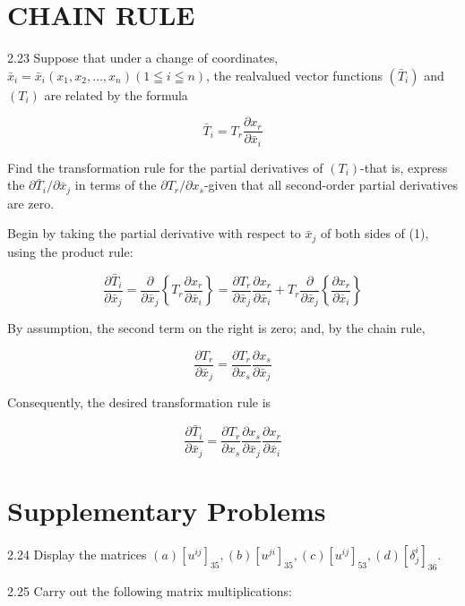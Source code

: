 \documentclass[10pt]{article}
\begin{document}
\section*{CHAIN RULE}
2.23 Suppose that under a change of coordinates, $\bar{x}_{i}=\bar{x}_{i}\left(x_{1}, x_{2}, \ldots, x_{n}\right)(1 \leqq i \leqq n)$, the realvalued vector functions $\left(\bar{T}_{i}\right)$ and $\left(T_{i}\right)$ are related by the formula


\begin{equation*}
\bar{T}_{i}=T_{r} \frac{\partial x_{r}}{\partial \bar{x}_{i}} \tag{1}
\end{equation*}


Find the transformation rule for the partial derivatives of $\left(T_{i}\right)$-that is, express the $\partial \bar{T}_{i} / \partial \bar{x}_{j}$ in terms of the $\partial T_{r} / \partial x_{s}$-given that all second-order partial derivatives are zero.

Begin by taking the partial derivative with respect to $\bar{x}_{j}$ of both sides of (1), using the product rule:

$$
\frac{\partial \bar{T}_{i}}{\partial \bar{x}_{j}}=\frac{\partial}{\partial \bar{x}_{j}}\left\{T_{r} \frac{\partial x_{r}}{\partial \bar{x}_{i}}\right\}=\frac{\partial T_{r}}{\partial \bar{x}_{j}} \frac{\partial x_{r}}{\partial \bar{x}_{i}}+T_{r} \frac{\partial}{\partial \bar{x}_{j}}\left\{\frac{\partial x_{r}}{\partial \bar{x}_{i}}\right\}
$$

By assumption, the second term on the right is zero; and, by the chain rule,

$$
\frac{\partial T_{r}}{\partial \bar{x}_{j}}=\frac{\partial T_{r}}{\partial x_{s}} \frac{\partial x_{s}}{\partial \bar{x}_{j}}
$$

Consequently, the desired transformation rule is

$$
\frac{\partial \bar{T}_{i}}{\partial \bar{x}_{j}}=\frac{\partial T_{r}}{\partial x_{s}} \frac{\partial x_{s}}{\partial \bar{x}_{j}} \frac{\partial x_{r}}{\partial \bar{x}_{i}}
$$

\section*{Supplementary Problems}
2.24 Display the matrices $(a)\left[u^{i j}\right]_{35},(b)\left[u^{j i}\right]_{35},(c)\left[u^{i j}\right]_{53},(d)\left[\delta_{j}^{i}\right]_{36}$.

2.25 Carry out the following matrix multiplications:
\end{document}
